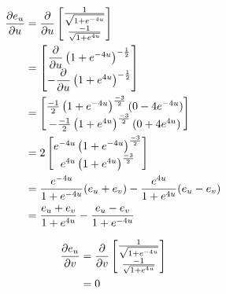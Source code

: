\documentclass[a4paper, 11pt]{article}
\begin{document}
\begin{enumerate}[label=(\alph*)]
        \begin{mdframed}
          \begin{minipage}[t]{0.5\textwidth}
            \begin{align*}
              \dfrac{\partial e_u}{\partial u} & = \dfrac{\partial}{\partial u}\begin{bmatrix}
                                    \frac{1}{\sqrt{1 + e^{-4u}}} \\
                                    \frac{-1}{\sqrt{1 + e^{4u}}}
                                  \end{bmatrix}                       \\
                        & = \begin{bmatrix}
                              \dfrac{\partial}{\partial u}\left( 1 + e^{-4u} \right)^{-\frac 12} \\
                              -\dfrac{\partial}{\partial u}\left(1 + e^{4u} \right)^{-\frac 12}
                            \end{bmatrix}                 \\
                        & =  \begin{bmatrix}
                               \frac{-1}2\left( 1+e^{-4u} \right)^{\frac{-3}2}(0-4e^{-4u}) \\
                               -\frac{-1}2\left( 1+e^{4u} \right)^{\frac{-3}2}(0+4e^{4u})
                             \end{bmatrix} \\
                        & =  2\begin{bmatrix}
                                e^{-4u}\left( 1+e^{-4u} \right)^{\frac{-3}2} \\
                                e^{4u}\left( 1+e^{4u} \right)^{\frac{-3}2}
                              \end{bmatrix}               \\
                        & =
              \frac{e^{-4u}}{
              1+e^{-4u}
              }(e_u+e_v)
              -\frac{e^{4u}}{1+e^{4u}}(e_u-e_v)                                          \\
                        & = \frac{e_u+e_v}{1+e^{4u}}-\frac{e_u-e_v}{1+e^{-4u}}
            \end{align*}
          \end{minipage}\begin{minipage}[t]{0.5\textwidth}
            \begin{align*}
              \dfrac{\partial e_u}{\partial v} & = \dfrac{\partial}{\partial v}\begin{bmatrix}
                                    \frac{1}{\sqrt{1 + e^{-4u}}} \\
                                    \frac{-1}{\sqrt{1 + e^{4u}}}
                                  \end{bmatrix} \\
                        & = 0
            \end{align*}
          \end{minipage}


\end{mdframed}
\end{enumerate}
\end{document}
